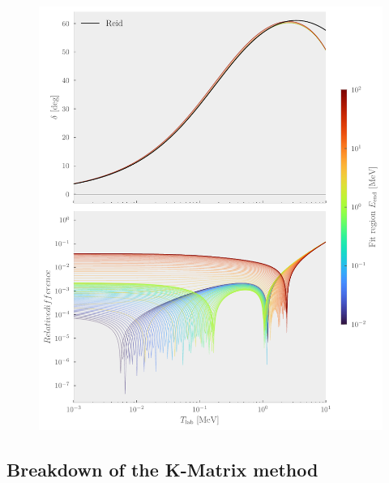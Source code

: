 \begin{figure}[pt]
  \centering
  \includegraphics{Figures/LO_region_error.pdf}
  \caption{\label{fig:LO_region_error} }
\end{figure}

\subsection{Breakdown of the K-Matrix method}
\label{sec:breakdown-k-matrix}




